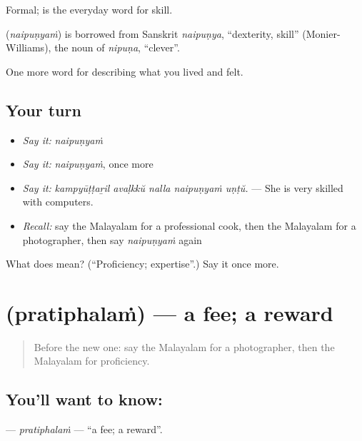 Formal;  is the everyday word for skill.

\begin{cousinweb}
\textbf{} (\emph{naipuṇyaṁ}) is borrowed from Sanskrit \emph{naipuṇya}, \textquotedblleft{}dexterity, skill\textquotedblright{} (Monier-Williams), the noun of \emph{nipuṇa}, \textquotedblleft{}clever\textquotedblright{}.
\end{cousinweb}

\begin{grammarlens}[title={What you've built}]
One more word for describing what you lived and felt.
\end{grammarlens}

\subsection*{Your turn}
\begin{itemize}
\raggedright
  \item \emph{Say it:} \emph{naipuṇyaṁ}
  \item \emph{Say it:} \emph{naipuṇyaṁ}, once more
  \item \emph{Say it:} \emph{kampyūṭṭaṟil avaḷkkŭ nalla naipuṇyaṁ uṇṭŭ.} — She is very skilled with computers.
  \item \emph{Recall:} say the Malayalam for a professional cook, then the Malayalam for a photographer, then say \emph{naipuṇyaṁ} again
\end{itemize}

\begin{tcolorbox}[breakable,colback=teal!4,colframe=teal!35!black,title={Before you move on}]
What does  mean? (\textquotedblleft{}Proficiency; expertise\textquotedblright{}.) Say it once more.
\end{tcolorbox}
\section[\texorpdfstring{\ml{പ്രതിഫലം} (pratiphalaṁ)}{പ്രതിഫലം (pratiphalaṁ)}]{ (pratiphalaṁ) — a fee; a reward}

\label{lesson:ML-C549-pratiphalam}



\begin{quote}
Before the new one: say the Malayalam for a photographer, then the Malayalam for proficiency.
\end{quote}

\subsection*{You'll want to know: }
\textbf{} — \emph{pratiphalaṁ} — \textquotedblleft{}a fee; a reward\textquotedblright{}.

